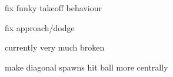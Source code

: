 
\begin{DoxyRefList}
\item[Class \mbox{\hyperlink{class_aerial_shot}{Aerial\+Shot}} ]\label{todo__todo000002}%
%
fix funky takeoff behaviour  
\item[Class \mbox{\hyperlink{class_dodge_shot}{Dodge\+Shot}} ]\label{todo__todo000003}%
%
fix approach/dodge  
\item[Class \mbox{\hyperlink{class_ground_shot}{Ground\+Shot}} ]\label{todo__todo000004}%
%
currently very much broken  
\item[Class \mbox{\hyperlink{class_speed_flip_kickoff}{Speed\+Flip\+Kickoff}} ]\label{todo__todo000001}%
%
make diagonal spawns hit ball more centrally 
\end{DoxyRefList}